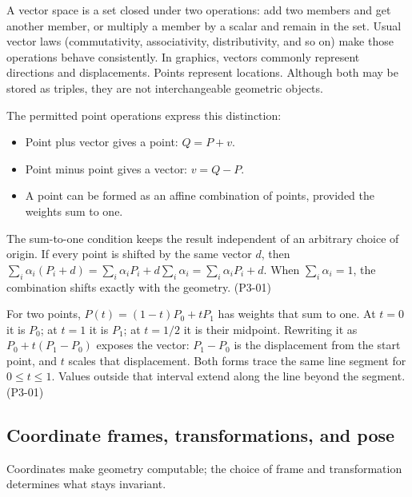 \hypertarget{03-visual-computing-i-ch001-points-and-vectors-obey-different-operations}{}

A vector space is a set closed under two operations: add two members and get another member, or multiply a member by a scalar and remain in the set. Usual vector laws (commutativity, associativity, distributivity, and so on) make those operations behave consistently. In graphics, vectors commonly represent directions and displacements. Points represent locations. Although both may be stored as triples, they are not interchangeable geometric objects.

The permitted point operations express this distinction:

\begin{itemize}
\tightlist
\item
  Point plus vector gives a point: \(Q=P+v\).
\item
  Point minus point gives a vector: \(v=Q-P\).
\item
  A point can be formed as an affine combination of points, provided the weights sum to one.
\end{itemize}

The sum-to-one condition keeps the result independent of an arbitrary choice of origin. If every point is shifted by the same vector \(d\), then \(\sum_i\alpha_i(P_i+d)=\sum_i\alpha_iP_i+d\sum_i\alpha_i=\sum_i\alpha_iP_i+d\). When \(\sum_i\alpha_i=1\), the combination shifts exactly with the geometry. (P3-01)

For two points, \(P(t)=(1-t)P_0+tP_1\) has weights that sum to one. At \(t=0\) it is \(P_0\); at \(t=1\) it is \(P_1\); at \(t=1/2\) it is their midpoint. Rewriting it as \(P_0+t(P_1-P_0)\) exposes the vector: \(P_1-P_0\) is the displacement from the start point, and \(t\) scales that displacement. Both forms trace the same line segment for \(0\leq t\leq1\). Values outside that interval extend along the line beyond the segment. (P3-01)

\subsection{Coordinate frames, transformations, and pose}\label{03-visual-computing-i-ch001-coordinate-frames-transformations-and-pose}

\hypertarget{03-visual-computing-i-ch001-coordinate-frames-transformations-and-pose}{}

Coordinates make geometry computable; the choice of frame and transformation determines what stays invariant.

